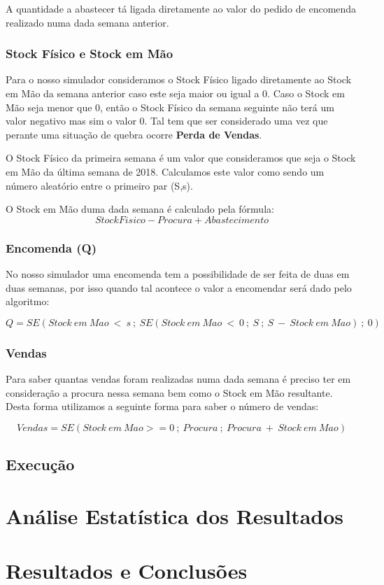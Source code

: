\documentclass[a4paper]{article}
\begin{document}
A quantidade a abastecer tá ligada diretamente ao valor do pedido de encomenda realizado numa dada semana anterior.


\subsubsection{Stock Físico e Stock em Mão}

Para o nosso simulador consideramos o Stock Físico ligado diretamente ao Stock em Mão da semana anterior caso este seja maior ou igual a 0. Caso o Stock em Mão seja menor que 0, então o Stock Físico da semana seguinte não terá um valor negativo mas sim o valor 0. Tal tem que ser considerado uma vez que perante uma situação de quebra ocorre \textbf{Perda de Vendas}.

O Stock Físico da primeira semana é um valor que consideramos que seja o Stock em Mão da última semana de 2018. Calculamos este valor como sendo um número aleatório entre o primeiro par (S,s).

O Stock em Mão duma dada semana é calculado pela fórmula: $$ StockFisico - Procura + Abastecimento $$


\subsubsection{Encomenda (Q)}

No nosso simulador uma encomenda tem a possibilidade de ser feita de duas em duas semanas, por isso quando tal acontece o valor a encomendar será dado pelo algoritmo:

 $$ Q = SE(Stock\ em\ Mao\ <\ s\ ;\ SE(Stock\ em\ Mao\ <\ 0\ ;\ S\ ;\ S\ -\ Stock\ em\ Mao)\ ;\ 0 ) $$
 
 
\subsubsection{Vendas}

Para saber quantas vendas foram realizadas numa dada semana é preciso ter em consideração a procura nessa semana bem como o Stock em Mão resultante. Desta forma utilizamos a seguinte forma para saber o número de vendas: 

 $$ Vendas = SE(Stock\ em\ Mao >= 0\ ;\ Procura\ ;\ Procura\ +\ Stock\ em\ Mao) $$




\subsection{Execução}

\section{Análise Estatística dos Resultados}

\section{Resultados e Conclusões}
\label{sec:conclusao}
\end{document}
